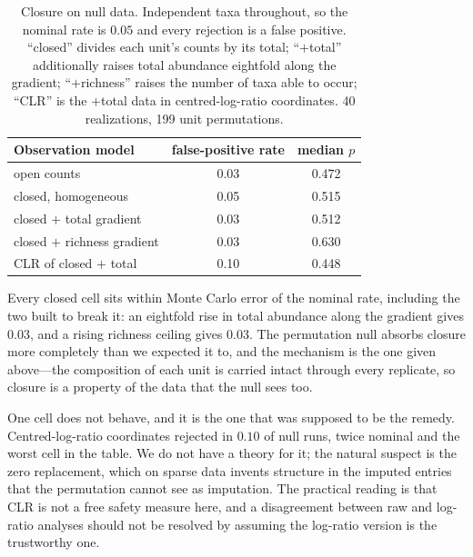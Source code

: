 \documentclass[review,12pt,authoryear]{elsarticle}
\theoremstyle{remark}
\begin{document}
\begin{table}[t]
\centering
\caption{Closure on null data. Independent taxa throughout, so the nominal
rate is $0.05$ and every rejection is a false positive. ``closed'' divides
each unit's counts by its total; ``$+$total'' additionally raises total
abundance eightfold along the gradient; ``$+$richness'' raises the number of
taxa able to occur; ``CLR'' is the $+$total data in centred-log-ratio
coordinates. 40 realizations, 199 unit permutations.}
\label{tab:closure}
\begin{tabular}{lcc}
\toprule
Observation model & false-positive rate & median $p$ \\
\midrule
open counts                  & 0.03 & 0.472 \\
closed, homogeneous          & 0.05 & 0.515 \\
closed $+$ total gradient    & 0.03 & 0.512 \\
closed $+$ richness gradient & 0.03 & 0.630 \\
CLR of closed $+$ total      & 0.10 & 0.448 \\
\bottomrule
\end{tabular}
\end{table}

Every closed cell sits within Monte Carlo error of the nominal rate,
including the two built to break it: an eightfold rise in total abundance
along the gradient gives $0.03$, and a rising richness ceiling gives $0.03$.
The permutation null absorbs closure more completely than we expected it
to, and the mechanism is the one given above---the composition of each unit
is carried intact through every replicate, so closure is a property of the
data that the null sees too.

One cell does not behave, and it is the one that was supposed to be the
remedy. Centred-log-ratio coordinates rejected in $0.10$ of null runs, twice
nominal and the worst cell in the table. We do not have a theory for it; the
natural suspect is the zero replacement, which on sparse data invents
structure in the imputed entries that the permutation cannot see as
imputation. The practical reading is that CLR is not a free safety
measure here, and a disagreement between raw and log-ratio analyses should
not be resolved by assuming the log-ratio version is the trustworthy one.
\end{document}
